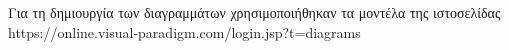 \documentclass{article}
\begin{document}
\coverpages






\renewcommand*\refname{Βιβλιογραφία}

Για τη δημιουργία των διαγραμμάτων χρησιμοποιήθηκαν τα μοντέλα της ιστοσελίδας \newline 
https://online.visual-paradigm.com/login.jsp?t=diagrams
\end{document}
